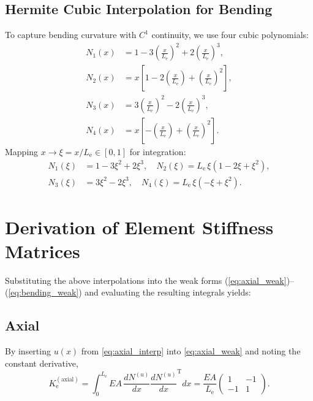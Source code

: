 \documentclass{article}
\begin{document}
	\subsection{Hermite Cubic Interpolation for Bending}
	To capture bending curvature with \(C^1\) continuity, we use four cubic polynomials:
	\begin{equation}\label{eq:cubic_interp}
		\begin{aligned}
			N_1(x)&=1-3(\tfrac{x}{L_\mathrm{e}})^2+2(\tfrac{x}{L_\mathrm{e}})^3,\\
			N_2(x)&=x[1-2(\tfrac{x}{L_\mathrm{e}})+(\tfrac{x}{L_\mathrm{e}})^2],\\
			N_3(x)&=3(\tfrac{x}{L_\mathrm{e}})^2-2(\tfrac{x}{L_\mathrm{e}})^3,\\
			N_4(x)&=x[-(\tfrac{x}{L_\mathrm{e}})+(\tfrac{x}{L_\mathrm{e}})^2].
		\end{aligned}
	\end{equation}
	Mapping \(x\to\xi=x/L_\mathrm{e}\in[0,1]\) for integration:
	\begin{equation}\label{eq:map_interp}
		\begin{aligned}
			N_1(\xi)&=1-3\xi^2+2\xi^3,\quad
			N_2(\xi)=L_\mathrm{e}\,\xi(1-2\xi+\xi^2),\\
			N_3(\xi)&=3\xi^2-2\xi^3,\quad
			N_4(\xi)=L_\mathrm{e}\,\xi(-\xi+\xi^2).
		\end{aligned}
	\end{equation}
	
	\section{Derivation of Element Stiffness Matrices}
	Substituting the above interpolations into the weak forms (\ref{eq:axial_weak})–(\ref{eq:bending_weak}) and evaluating the resulting integrals yields:
	
	\subsection{Axial}
	By inserting \(u(x)\) from \eqref{eq:axial_interp} into \eqref{eq:axial_weak} and noting the constant derivative,
	\begin{equation}\label{eq:ke_axial}
		K_\mathrm{e}^{(\mathrm{axial})}
		= \int_0^{L_\mathrm{e}}EA\,\frac{dN^{(u)}}{dx}\frac{dN^{(u)}}{dx}^\text{T}dx
		= \frac{EA}{L_\mathrm{e}}
		\begin{pmatrix}1 & -1\\ -1 & 1\end{pmatrix}.
	\end{equation}
\end{document}
